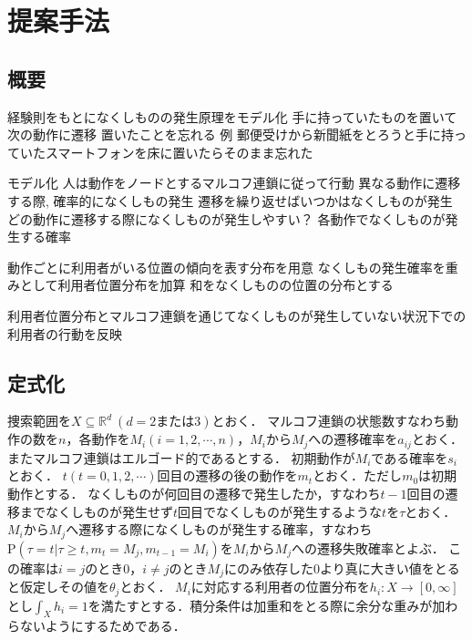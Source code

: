 \chapter{提案手法}\label{chap:method}

\section{概要}
経験則をもとになくしものの発生原理をモデル化
手に持っていたものを置いて次の動作に遷移
置いたことを忘れる
例
郵便受けから新聞紙をとろうと手に持っていたスマートフォンを床に置いたらそのまま忘れた

モデル化
人は動作をノードとするマルコフ連鎖に従って行動
異なる動作に遷移する際, 確率的になくしもの発生
遷移を繰り返せばいつかはなくしものが発生
どの動作に遷移する際になくしものが発生しやすい？
各動作でなくしものが発生する確率

動作ごとに利用者がいる位置の傾向を表す分布を用意
なくしもの発生確率を重みとして利用者位置分布を加算
和をなくしものの位置の分布とする

利用者位置分布とマルコフ連鎖を通じてなくしものが発生していない状況下での利用者の行動を反映

\section{定式化}
捜索範囲を$ X \subseteq \mathbb{R}^d \  (d=2または3)$とおく．
マルコフ連鎖の状態数すなわち動作の数を$ n $，各動作を$ M_i (i=1,2,\cdots ,n)$，$ M_i $から$ M_j $への遷移確率を$ a_{i j} $とおく．
またマルコフ連鎖はエルゴード的であるとする．\cite{funaki}
初期動作が$ M_i $である確率を$ s_i $とおく．
$ t(t=0,1,2,\cdots) $回目の遷移の後の動作を$ m_t $とおく．ただし$ m_0 $は初期動作とする．
なくしものが何回目の遷移で発生したか，すなわち$ t - 1 $回目の遷移までなくしものが発生せず$ t $回目でなくしものが発生するような$ t $を$ \tau $とおく．
$ M_i $から$ M_j $へ遷移する際になくしものが発生する確率，すなわち$ \mathrm{P}(\tau = t | \tau \ge t , m_t = M_j , m_{t - 1} = M_i) $を$ M_i $から$ M_j $への遷移失敗確率とよぶ．
この確率は$ i = j $のとき$ 0 $，$ i \ne j $のとき$ M_j $にのみ依存した$ 0 $より真に大きい値をとると仮定しその値を$ \theta_j $とおく．
$ M_i $に対応する利用者の位置分布を$ h_i:X \rightarrow [0,\infty] $とし$ \int_X h_i = 1 $を満たすとする．積分条件は加重和をとる際に余分な重みが加わらないようにするためである．


